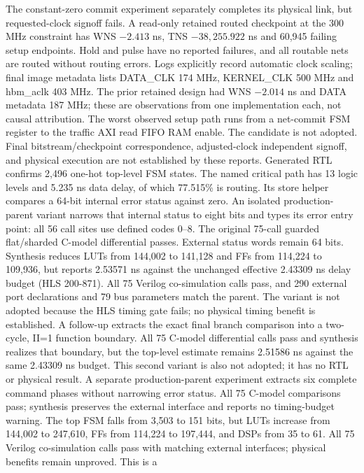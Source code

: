 \documentclass[10pt]{article}
\begin{document}
The constant-zero commit experiment separately completes its physical
link, but requested-clock signoff fails. A read-only retained routed
checkpoint at the 300 MHz constraint has WNS $-2.413$ ns, TNS
$-38,255.922$ ns and 60,945 failing setup endpoints. Hold and pulse have
no reported failures, and all routable nets are routed without routing
errors. Logs explicitly record automatic clock scaling; final image
metadata lists DATA\_CLK 174 MHz, KERNEL\_CLK 500 MHz and hbm\_aclk 403 MHz.
The prior retained design had WNS $-2.014$ ns and DATA metadata 187 MHz;
these are observations from one implementation each, not causal attribution.
The worst observed setup path runs from a net-commit FSM register to the
traffic AXI read FIFO RAM enable. The candidate is not adopted. Final
bitstream/checkpoint correspondence, adjusted-clock independent signoff,
and physical execution are not established by these reports.
Generated RTL confirms 2,496 one-hot top-level FSM states. The named
critical path has 13 logic levels and 5.235 ns data delay, of which
77.515\% is routing. Its store helper compares a 64-bit internal error
status against zero. An isolated production-parent variant narrows that
internal status to eight bits and types its error entry point: all 56
call sites use defined codes 0--8. The original 75-call guarded flat/sharded
C-model differential passes. External status words remain 64 bits. Synthesis reduces LUTs from
144,002 to 141,128 and FFs from 114,224 to 109,936, but reports
2.53571 ns against the unchanged effective 2.43309 ns delay budget
(HLS 200-871). All 75 Verilog co-simulation calls pass, and 290 external port
declarations and 79 bus parameters match the parent. The variant is not
adopted because the HLS timing gate fails; no physical timing benefit
is established. A follow-up extracts the exact final branch comparison
into a two-cycle, II=1 function boundary. All 75 C-model differential
calls pass and synthesis realizes that boundary, but the top-level
estimate remains 2.51586 ns against the same 2.43309 ns budget.
This second variant is also not adopted; it has no RTL or physical result.
A separate production-parent experiment extracts six complete command
phases without narrowing error status. All 75 C-model comparisons pass;
synthesis preserves the external interface and reports no timing-budget
warning. The top FSM falls from 3,503 to 151 bits, but LUTs increase
from 144,002 to 247,610, FFs from 114,224 to 197,444, and DSPs from
35 to 61. All 75 Verilog co-simulation calls pass with matching external
interfaces; physical benefits remain unproved. This is a
\end{document}
